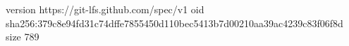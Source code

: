 version https://git-lfs.github.com/spec/v1
oid sha256:379c8e94fd31c74dffe7855450d110bec5413b7d00210aa39ac4239c83f06f8d
size 789
